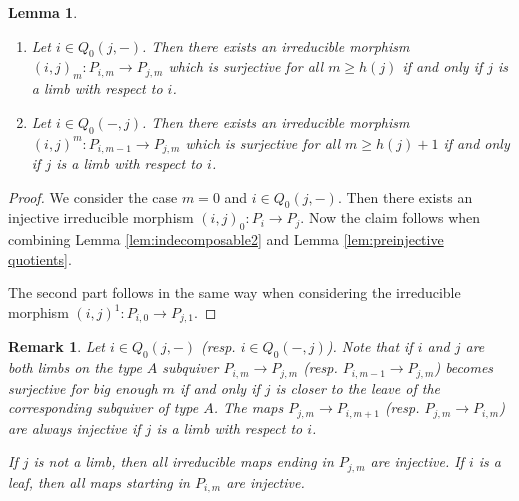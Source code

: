 \documentclass{amsart}
\newtheorem{lemma}[theorem]{Lemma}
\newtheorem{remark}[theorem]{Remark}
\numberwithin{equation}{section}
\begin{document}
\begin{lemma}\label{lem:irreducible morphisms}\begin{enumerate}
\item Let $i\in Q_0(j,-)$. Then there exists an irreducible morphism $(i,j)_m:P_{i,m}\to P_{j,m}$ which is surjective for all $m\geq h(j)$ if and only if $j$ is a limb with respect to $i$. 
\item Let $i\in Q_0(-,j)$. Then there exists an irreducible morphism $(i,j)^m:P_{i,m-1}\to P_{j,m}$ which is surjective for all $m\geq h(j)+1$ if and only if $j$ is a limb with respect to $i$.
\end{enumerate}

\end{lemma}
\begin{proof}

We consider the case $m=0$ and $i\in Q_0(j,-)$. Then there exists an injective irreducible morphism $(i,j)_0:P_{i}\to P_j$.  Now the claim follows when combining Lemma \ref{lem:indecomposable2} and Lemma \ref{lem:preinjective quotients}.




The second part follows in the same way when considering the irreducible morphism $(i,j)^1:P_{i,0}\to P_{j,1}$.



\end{proof}
\begin{remark}Let $i\in Q_0(j,-)$ (resp. $i\in Q_0(-,j)$). Note that if $i$ and $j$ are both limbs on the type $A$ subquiver $P_{i,m}\to P_{j,m}$ (resp. $P_{i,m-1}\to P_{j,m}$) becomes surjective for big enough $m$ if and only if $j$ is closer to the leave of the corresponding subquiver of type $A$. The maps $P_{j,m}\to P_{i,m+1}$ (resp. $P_{j,m}\to P_{i,m}$) are always injective if $j$ is a limb with respect to $i$.

If $j$ is not a limb, then all irreducible maps ending in $P_{j,m}$ are injective. If $i$ is a leaf, then all maps starting in $P_{i,m}$ are injective.
\end{remark}
\end{document}
